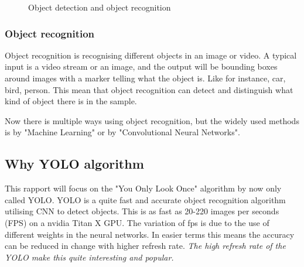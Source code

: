 \begin{figure}%
    \centering
    \qquad
    \caption{Object detection and object recognition}
    \label{fig:OdVsOr}
\end{figure}

\subsubsection*{Object recognition}
Object recognition is recognising different objects in an image or video. A typical input is a video stream or an image, and the output will be bounding boxes around images with a marker telling what the object is. Like for instance, car, bird, person. This mean that object recognition can detect and distinguish what kind of object there is in the sample.

Now there is multiple ways using object recognition, but the widely used methods is by "Machine Learning" or by "Convolutional Neural Networks".

\subsection{ Why YOLO algorithm}
This rapport will focus on the "You Only Look Once" algorithm by now only called YOLO. YOLO is a quite fast and accurate object recognition algorithm utilising CNN to detect objects. This is as fast as 20-220 images per seconds (FPS) on a nvidia Titan X GPU. The variation of fps is due to the use of different weights in the neural networks. In easier terms this means the accuracy can be reduced in change with higher refresh rate. \textit{The high refresh rate of the YOLO make this quite interesting and popular. } \cite{yolo_res}
